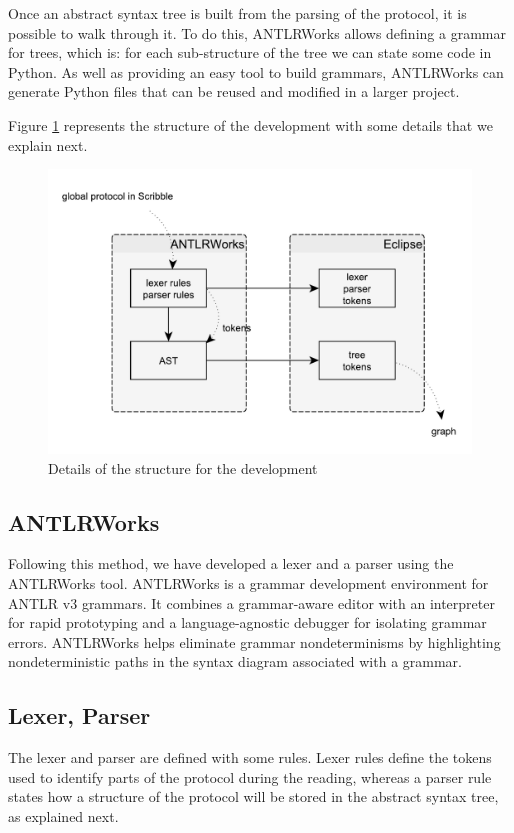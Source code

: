 \documentclass[a4paper,11pt,twoside]{report}
\begin{document}
Once an abstract syntax tree is built from the parsing of the protocol, it is possible to walk through it. To do this, ANTLRWorks allows defining a grammar for trees, which is: for each sub-structure of the tree we can state some code in Python. As well as providing an easy tool to build grammars, ANTLRWorks can generate Python files that can be reused and modified in a larger project. 

Figure \ref{fig:zoomstructure} represents the structure of the development with some details that we explain next.

\begin{figure}[h]
\begin{center}
\includegraphics[scale=0.7]{zoomstructure}
\end{center}
\caption{Details of the structure for the development}\label{fig:zoomstructure}
\end{figure}

\subsection{ANTLRWorks}
Following this method, we have developed a lexer and a parser using the ANTLRWorks tool. ANTLRWorks is a grammar development environment for ANTLR v3 grammars. It combines a grammar-aware editor with an interpreter for rapid prototyping and a language-agnostic debugger for isolating grammar errors. ANTLRWorks helps eliminate grammar nondeterminisms by highlighting nondeterministic paths in the syntax diagram associated with a grammar.

\subsection{Lexer, Parser}
The lexer and parser are defined with some rules. Lexer rules define the tokens used to identify parts of the protocol during the reading, whereas a parser rule states how a structure of the protocol will be stored in the abstract syntax tree, as explained next.
\end{document}
